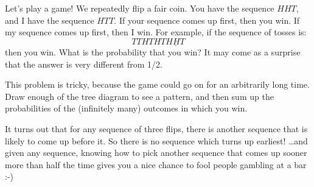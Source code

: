 \documentclass[12pt,twoside]{article}
\begin{document}
\begin{problem}{25}
Let's play a game!  We repeatedly flip a fair coin.  You have the
sequence $HHT$, and I have the sequence $HTT$.  If your sequence comes
up first, then you win.  If my sequence comes up first, then I win.
For example, if the sequence of tosses is:
\[
TTHTHT\underline{HHT}
\]
then you win.  What is the probability that you win?  It may come as a
surprise that the answer is very different from 1/2.

This problem is tricky, because the game could go on for an arbitrarily
long time.  Draw enough of the tree diagram to see a pattern, and then sum
up the probabilities of the (infinitely many) outcomes in which you win.

It turns out that for any sequence of three flips, there is another
sequence that is likely to come up before it.  So there is no sequence
which turns up earliest! \dots and given any sequence, knowing how to pick
another sequence that comes up sooner more than half the time gives you a
nice chance to fool people gambling at a bar :-)


\end{problem}
\end{document}
